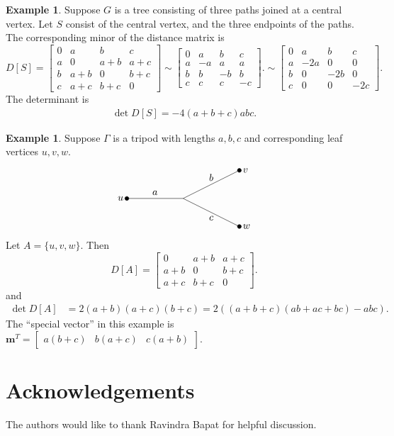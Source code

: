 \documentclass{amsart}
\theoremstyle{definition}
\newtheorem{eg}[thm]{Example}
\begin{document}
\begin{eg}
Suppose $G$ is a tree consisting of three paths joined at a central vertex.
Let $S$ consist of the central vertex, and the three endpoints of the paths. 
The corresponding minor of the distance matrix is
$$
D[S] = \begin{bmatrix}
0 & a & b & c \\
a & 0 & a + b & a + c \\
b & a + b & 0 & b + c \\
c & a + c & b + c & 0
\end{bmatrix}
\sim \begin{bmatrix}
0 & a & b & c \\
a & -a & a  & a \\
b & b & -b & b \\
c & c & c & -c
\end{bmatrix}.
\sim \begin{bmatrix}
0 & a & b & c \\
a & -2a & 0 & 0 \\
b & 0 & -2b & 0 \\
c & 0 & 0 & -2c
\end{bmatrix}.
$$
The determinant is
\begin{align*}
\det D[S] 
= -4(a+b+c)abc.
\end{align*}
\end{eg}

\begin{eg}
Suppose $\Gamma$ is a tripod with lengths $a,b,c$ and corresponding leaf vertices $u,v,w$.
\[
\begin{tikzpicture}
	\draw (0,0) -- (-2,0);
	\draw (2,1) -- (0,0) -- (2,-1);
	\filldraw[black] (-2,0) circle (2pt);
	\filldraw[black] (2,1) circle (2pt);
	\filldraw[black] (2,-1) circle (2pt);

	\node[above] at (-1,0) {$a$};
	\node[above] at (1,0.5) {$b$};
	\node[below] at (1,-0.5) {$c$};

	\node[left] at (-2,0) {$u$};
	\node[right] at (2,1) {$v$};
	\node[right] at (2,-1) {$w$};
\end{tikzpicture}
\]
Let $A = \{u,v,w\}$.
Then 
$$
D[A] = \begin{bmatrix}
0 & a + b & a + c \\
a + b & 0 & b + c \\
a + c & b + c & 0
\end{bmatrix}.
$$
and
\begin{align*}
\det D[A] &= 2(a+b)(a+c)(b+c) 
= 2\left( (a+b+c)(ab + ac + bc) - abc \right).
\end{align*}
The ``special vector'' in this example is $\mathbf{m}^T = \begin{bmatrix} a(b + c) & b(a + c) & c(a + b) \end{bmatrix}$.
\end{eg}


\section*{Acknowledgements}
The authors would like to thank Ravindra Bapat for helpful discussion.


 

\end{document}
